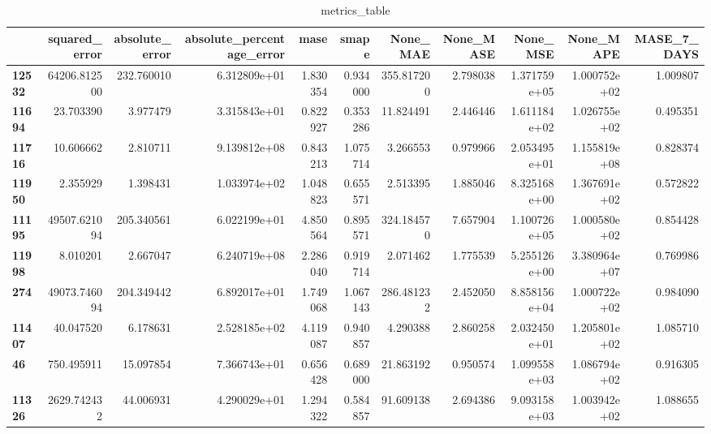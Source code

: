 \begin{table}[h]
\centering
\caption{metrics_table}
\label{table:Experiment with CNN AE and LSTM hybrid method. Global, multivariate, dataset 2. Tuned with LSTM Global multivariate dataset 2}
\begin{tabular}{lrrrrrrrrrr}
\toprule
{} &  squared\_error &  absolute\_error &  absolute\_percentage\_error &      mase &     smape &     None\_MAE &  None\_MASE &      None\_MSE &     None\_MAPE &  MASE\_7\_DAYS \\
\midrule
\textbf{12532} &   64206.812500 &      232.760010 &               6.312809e+01 &  1.830354 &  0.934000 &   355.817200 &   2.798038 &  1.371759e+05 &  1.000752e+02 &     1.009807 \\
\textbf{11694} &      23.703390 &        3.977479 &               3.315843e+01 &  0.822927 &  0.353286 &    11.824491 &   2.446446 &  1.611184e+02 &  1.026755e+02 &     0.495351 \\
\textbf{11716} &      10.606662 &        2.810711 &               9.139812e+08 &  0.843213 &  1.075714 &     3.266553 &   0.979966 &  2.053495e+01 &  1.155819e+08 &     0.828374 \\
\textbf{11950} &       2.355929 &        1.398431 &               1.033974e+02 &  1.048823 &  0.655571 &     2.513395 &   1.885046 &  8.325168e+00 &  1.367691e+02 &     0.572822 \\
\textbf{11195} &   49507.621094 &      205.340561 &               6.022199e+01 &  4.850564 &  0.895571 &   324.184570 &   7.657904 &  1.100726e+05 &  1.000580e+02 &     0.854428 \\
\textbf{11998} &       8.010201 &        2.667047 &               6.240719e+08 &  2.286040 &  0.919714 &     2.071462 &   1.775539 &  5.255126e+00 &  3.380964e+07 &     0.769986 \\
\textbf{274  } &   49073.746094 &      204.349442 &               6.892017e+01 &  1.749068 &  1.067143 &   286.481232 &   2.452050 &  8.858156e+04 &  1.000722e+02 &     0.984090 \\
\textbf{11407} &      40.047520 &        6.178631 &               2.528185e+02 &  4.119087 &  0.940857 &     4.290388 &   2.860258 &  2.032450e+01 &  1.205801e+02 &     1.085710 \\
\textbf{46   } &     750.495911 &       15.097854 &               7.366743e+01 &  0.656428 &  0.689000 &    21.863192 &   0.950574 &  1.099558e+03 &  1.086794e+02 &     0.916305 \\
\textbf{11326} &    2629.742432 &       44.006931 &               4.290029e+01 &  1.294322 &  0.584857 &    91.609138 &   2.694386 &  9.093158e+03 &  1.003942e+02 &     1.088655 \\

\end{tabular}
\end{table}
